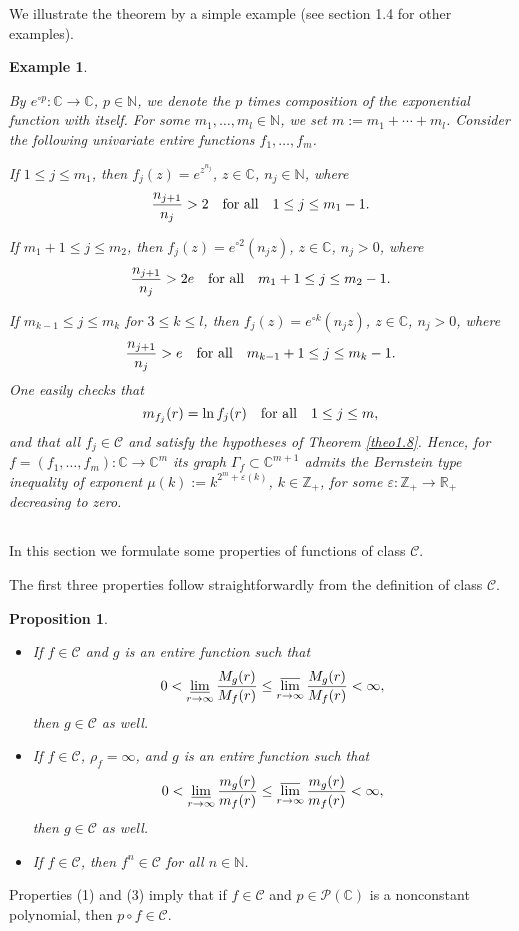 \documentclass[11pt, oneside]{amsart}
\newtheorem{Proposition}[Th]{Proposition}
\newtheorem{E}[Th]{Example}
\begin{document}
We illustrate  the theorem by a simple example (see section 1.4 for other examples).
\begin{E}\label{ex1.9}
{\rm By $e^{\circ p}:\mathbb C\rightarrow \mathbb C$, $p\in\mathbb N$, we denote the $p$ times composition of the exponential function with itself. For some $m_1,\dots, m_l\in\mathbb N$, we set $m:=m_1+\cdots +m_l$. Consider the following univariate entire functions $f_1,\dots, f_m$.

If $1\le j\le m_1$, then $f_j(z)=e^{z^{n_j}}$, $z\in\mathbb C$, $n_j\in\mathbb N$, where
\[
\frac{n_{j+1}}{n_j}>2\quad {\rm for\ all}\quad 1\le j\le m_1-1.
\]

If $m_1+1\le j\le m_2$, then $f_j(z)=e^{\circ 2}(n_j z)$, $z\in\mathbb C$, $n_j>0$, where
\[
\frac{n_{j+1}}{n_j}>2e\quad {\rm for\ all}\quad m_1+1\le j\le m_2-1.
\]

If $m_{k-1}\le j\le m_{k}$ for $3\le k\le l$, then $f_j(z)=e^{\circ k}(n_j z)$, $z\in\mathbb C$,  $n_j>0$, where
\[
\frac{n_{j+1}}{n_j}>e\quad {\rm for\ all}\quad m_{k-1}+1\le j\le m_k-1.
\]
One easily checks that 
\[
m_{f_j}(r)=\ln f_j(r)\quad {\rm for\ all}\quad 1\le j\le m,
\]
and that all $f_j\in\mathscr C$ and satisfy the hypotheses of Theorem \ref{theo1.8}. Hence, for $f=(f_1,\dots, f_{m}):\mathbb C\rightarrow\mathbb C^{m}$ its graph $\Gamma_f\subset\mathbb C^{m+1}$ admits the Bernstein type inequality of exponent $\mu(k):=k^{2^{m}+\varepsilon(k)}$, $k\in\mathbb Z_+$, for some $\varepsilon :
\mathbb Z_+\rightarrow \mathbb R_+$ decreasing to zero.
}
\end{E}
\subsection{} In this section we formulate some properties of functions of class $\mathscr C$.\smallskip

The first three properties follow straightforwardly from the definition of class $\mathscr C$.
\begin{Proposition}\label{propo1.11}
\begin{itemize}
\item[(1)]
If $f\in\mathscr C$ and $g$ is an entire function such that 
\[
0<\varliminf_{r\rightarrow\infty}\frac{M_g(r)}{ M_f(r)}\le\varlimsup_{r\rightarrow\infty}\frac{M_g(r)}{ M_f(r)}<\infty,
\] 
then $g\in\mathscr C$ as well.\smallskip

\item[(2)]
If $f\in\mathscr C$, $\rho_f=\infty$,  and $g$ is an entire function such that 
\[
0<\varliminf_{r\rightarrow\infty}\frac{m_g(r)}{ m_f(r)}\le\varlimsup_{r\rightarrow\infty}\frac{m_g(r)}{ m_f(r)}<\infty,
\] 
then $g\in\mathscr C$ as well.\smallskip

\item[(3)] If $f\in\mathscr C$, then $f^n\in\mathscr C$ for all $n\in\mathbb N$.
\end{itemize}
\end{Proposition}
Properties (1) and (3) imply that if $f\in\mathscr C$ and $p\in\mathcal P(\mathbb C)$ is a nonconstant polynomial, then $p\circ f\in\mathscr C$.\medskip
\end{document}
